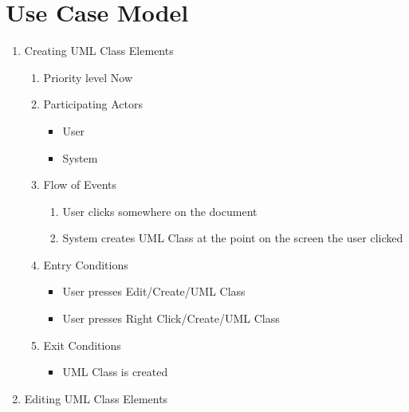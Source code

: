 \documentclass[a4paper, 12pt]{article}
\begin{document}
\section{Use Case Model}

\begin{enumerate}
	\item Creating UML Class Elements
	\begin {enumerate}
		\item Priority level Now
		\item Participating Actors
		\begin{itemize}
			\item User
			\item System
		\end {itemize}
		\item Flow of Events
		\begin {enumerate}
			\item User clicks somewhere on the document
			\item System creates UML Class at the point on the screen the user clicked
		\end {enumerate}
		\item Entry Conditions
		\begin {itemize}
			\item User presses Edit/Create/UML Class
			\item User presses Right Click/Create/UML Class
		\end {itemize}
		\item Exit Conditions
		\begin {itemize}
			\item UML Class is created
		\end {itemize}
	\end {enumerate}

	\item Editing UML Class Elements
	



\end{enumerate}
\end{document}
